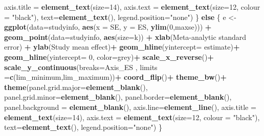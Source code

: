 \documentclass[
]{book}
\newenvironment{Shaded}{\begin{snugshade}}{\end{snugshade}}
\newcommand{\AttributeTok}[1]{\textcolor[rgb]{0.13,0.29,0.53}{#1}}
\newcommand{\ControlFlowTok}[1]{\textcolor[rgb]{0.13,0.29,0.53}{\textbf{#1}}}
\newcommand{\DecValTok}[1]{\textcolor[rgb]{0.00,0.00,0.81}{#1}}
\newcommand{\FunctionTok}[1]{\textcolor[rgb]{0.13,0.29,0.53}{\textbf{#1}}}
\newcommand{\NormalTok}[1]{#1}
\newcommand{\OtherTok}[1]{\textcolor[rgb]{0.56,0.35,0.01}{#1}}
\newcommand{\SpecialCharTok}[1]{\textcolor[rgb]{0.81,0.36,0.00}{\textbf{#1}}}
\newcommand{\StringTok}[1]{\textcolor[rgb]{0.31,0.60,0.02}{#1}}
\begin{document}
\begin{Shaded}
\begin{Highlighting}[]
          \AttributeTok{axis.title =} \FunctionTok{element\_text}\NormalTok{(}\AttributeTok{size=}\DecValTok{14}\NormalTok{),}
          \AttributeTok{axis.text =} \FunctionTok{element\_text}\NormalTok{(}\AttributeTok{size=}\DecValTok{12}\NormalTok{, }\AttributeTok{colour =} \StringTok{"black"}\NormalTok{),}
          \AttributeTok{text=}\FunctionTok{element\_text}\NormalTok{(),}
          \AttributeTok{legend.position=}\StringTok{"none"}\NormalTok{)}
\NormalTok{    \} }\ControlFlowTok{else}\NormalTok{ \{}
\NormalTok{    e }\OtherTok{\textless{}{-}} \FunctionTok{ggplot}\NormalTok{(}\AttributeTok{data=}\NormalTok{studyinfo, }\FunctionTok{aes}\NormalTok{(}\AttributeTok{x =}\NormalTok{ SE, }\AttributeTok{y =}\NormalTok{ ES, }\FunctionTok{ylim}\NormalTok{(}\DecValTok{0}\NormalTok{,maxse))) }\SpecialCharTok{+}
        \FunctionTok{geom\_point}\NormalTok{(}\AttributeTok{data=}\NormalTok{studyinfo, }\FunctionTok{aes}\NormalTok{(}\AttributeTok{size=}\NormalTok{k)) }\SpecialCharTok{+}
        \FunctionTok{xlab}\NormalTok{(}\StringTok{\textquotesingle{}Meta{-}analytic standard error\textquotesingle{}}\NormalTok{) }\SpecialCharTok{+} \FunctionTok{ylab}\NormalTok{(}\StringTok{\textquotesingle{}Study mean effect\textquotesingle{}}\NormalTok{)}\SpecialCharTok{+}
        \FunctionTok{geom\_hline}\NormalTok{(}\AttributeTok{yintercept=}\NormalTok{ estimate)}\SpecialCharTok{+}
        \FunctionTok{geom\_hline}\NormalTok{(}\AttributeTok{yintercept=} \DecValTok{0}\NormalTok{, }\AttributeTok{color=}\StringTok{\textquotesingle{}grey\textquotesingle{}}\NormalTok{)}\SpecialCharTok{+}
        \FunctionTok{scale\_x\_reverse}\NormalTok{()}\SpecialCharTok{+}
        \FunctionTok{scale\_y\_continuous}\NormalTok{(}\AttributeTok{breaks=}\NormalTok{Axis\_ES , }\AttributeTok{limits =}\FunctionTok{c}\NormalTok{(lim\_minimum,lim\_maximum))}\SpecialCharTok{+}
        \FunctionTok{coord\_flip}\NormalTok{()}\SpecialCharTok{+}
        \FunctionTok{theme\_bw}\NormalTok{()}\SpecialCharTok{+}
        \FunctionTok{theme}\NormalTok{(}\AttributeTok{panel.grid.major=}\FunctionTok{element\_blank}\NormalTok{(),}
              \AttributeTok{panel.grid.minor=}\FunctionTok{element\_blank}\NormalTok{(),}
              \AttributeTok{panel.border=}\FunctionTok{element\_blank}\NormalTok{(),}
              \AttributeTok{panel.background =} \FunctionTok{element\_blank}\NormalTok{(),}
              \AttributeTok{axis.line=}\FunctionTok{element\_line}\NormalTok{(),}
              \AttributeTok{axis.title =} \FunctionTok{element\_text}\NormalTok{(}\AttributeTok{size=}\DecValTok{14}\NormalTok{),}
              \AttributeTok{axis.text =} \FunctionTok{element\_text}\NormalTok{(}\AttributeTok{size=}\DecValTok{12}\NormalTok{, }\AttributeTok{colour =} \StringTok{"black"}\NormalTok{),}
              \AttributeTok{text=}\FunctionTok{element\_text}\NormalTok{(),}
              \AttributeTok{legend.position=}\StringTok{"none"}\NormalTok{)}
\NormalTok{    \}}
  

\end{Highlighting}
\end{Shaded}
\end{document}
